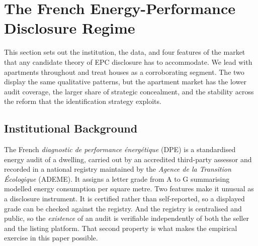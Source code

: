 %

\section{The French Energy-Performance Disclosure Regime}
\label{sec:setting}

This section sets out the institution, the data, and four features of the market that any
candidate theory of EPC disclosure has to accommodate. We lead with apartments throughout and
treat houses as a corroborating segment. The two display the same qualitative patterns, but the
apartment market has the lower audit coverage, the larger share of strategic concealment, and the
stability across the reform that the identification strategy exploits.

\subsection{Institutional Background}
\label{ss:institutions}

The French \emph{diagnostic de performance \'energ\'etique} (DPE) is a standardised energy audit of
a dwelling, carried out by an accredited third-party assessor and recorded in a national registry
maintained by the \emph{Agence de la Transition \'Ecologique} (ADEME). It assigns a letter grade
from A to G summarising modelled energy consumption per square metre. Two features make it
unusual as a disclosure instrument. It is certified rather than self-reported, so a displayed
grade can be checked against the registry. And the registry is centralised and public, so the
\emph{existence} of an audit is verifiable independently of both the seller and the listing
platform. That second property is what makes the empirical exercise in this paper possible.

